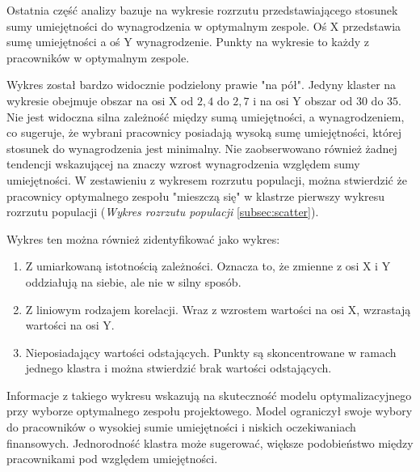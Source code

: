     \par Ostatnia część analizy bazuje na wykresie rozrzutu przedstawiającego stosunek sumy umiejętności do wynagrodzenia w optymalnym zespole. Oś X przedstawia sumę umiejętności a oś Y wynagrodzenie. Punkty na wykresie to każdy z pracowników w optymalnym zespole.

    \par Wykres został bardzo widocznie podzielony prawie "na pół". Jedyny klaster na wykresie obejmuje obszar na osi X od $2,4$ do $2,7$ i na osi Y obszar od $30$ do $35$. Nie jest widoczna silna zależność między sumą umiejętności, a wynagrodzeniem, co sugeruje, że wybrani pracownicy posiadają wysoką sumę umiejętności, której stosunek do wynagrodzenia jest minimalny. Nie zaobserwowano również żadnej tendencji wskazującej na znaczy wzrost wynagrodzenia względem sumy umiejętności. W zestawieniu z wykresem rozrzutu populacji, można stwierdzić że pracownicy optymalnego zespołu "mieszczą się" w klastrze pierwszy wykresu rozrzutu populacji (\textit{Wykres rozrzutu populacji} \ref{subsec:scatter}).

    \par Wykres ten można również zidentyfikować jako wykres:
    \begin{enumerate}
        \item Z umiarkowaną istotnością zależności. Oznacza to, że zmienne z osi X i Y oddziałują na siebie, ale nie w silny sposób.
        \item Z liniowym rodzajem korelacji. Wraz z wzrostem wartości na osi X, wzrastają wartości na osi Y.
        \item Nieposiadający wartości odstających. Punkty są skoncentrowane w ramach jednego klastra i można stwierdzić brak wartości odstających.
    \end{enumerate}

    \par Informacje z takiego wykresu wskazują na skuteczność modelu optymalizacyjnego przy wyborze optymalnego zespołu projektowego. Model ograniczył swoje wybory do pracowników o wysokiej sumie umiejętności i niskich oczekiwaniach finansowych. Jednorodność klastra może sugerować, większe podobieństwo między pracownikami pod względem umiejętności.
